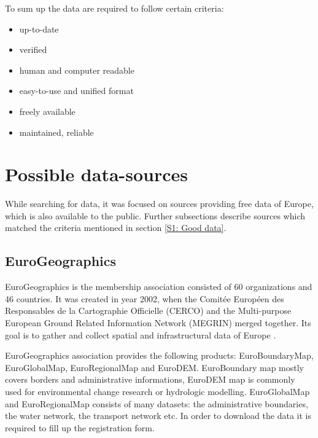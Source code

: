\documentclass[thesis=M,english]{FITthesis}[2012/10/20]
\begin{document}
To sum up the data are required to follow certain criteria:
\begin{itemize}
	\item up-to-date
	\item verified
	\item human and computer readable
	\item easy-to-use and unified format
	\item freely available
	\item maintained, reliable
\end{itemize}



\section{Possible data-sources}

While searching for data, it was focused on sources providing free data of Europe, which is also available to the public. Further subsections describe sources which matched the criteria mentioned in section \ref{S1: Good data}.

 
\subsection{EuroGeographics}
EuroGeographics is the membership association consisted of 60 organizations and 46 countries. It was created in year 2002, when the Comit{\' e}e Europ{\' e}en des Responsables de la Cartographie Officielle (CERCO) and the Multi-purpose European Ground Related Information Network (MEGRIN) merged together. Its goal is to gather and collect spatial and infrastructural data of Europe \cite{Euro16}. 

EuroGeographics association provides the following products: EuroBoundaryMap, EuroGlobalMap, EuroRegionalMap and EuroDEM.
EuroBoundary map mostly covers borders and administrative informations, EuroDEM map is commonly used for environmental change research or hydrologic modelling.
EuroGlobalMap and EuroRegionalMap consists of many datasets: the administrative boundaries, the water network, the transport network etc. 
In order to download the data it is required to fill up the registration form.
\end{document}
